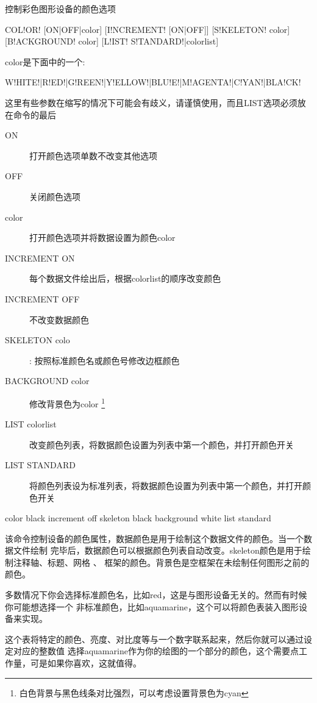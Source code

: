 \label{cmd:color}

控制彩色图形设备的颜色选项

\begin{SACSTX}
COL!OR! [ON|OFF|color] [I!NCREMENT! [ON|OFF]] [S!KELETON! color] 
    [B!ACKGROUND! color] [L!IST! S!TANDARD!|colorlist]
\end{SACSTX}
color是下面中的一个:
\begin{SACSTX}
W!HITE!|R!ED!|G!REEN!|Y!ELLOW!|BLU!E!|M!AGENTA!|C!YAN!|BLA!CK!
\end{SACSTX}
		
这里有些参数在缩写的情况下可能会有歧义，请谨慎使用，而且LIST选项必须放在命令的最后

\begin{description}
\item [ON] 打开颜色选项单数不改变其他选项
\item [OFF] 关闭颜色选项
\item [color] 打开颜色选项并将数据设置为颜色color
\item [INCREMENT ON] 每个数据文件绘出后，根据colorlist的顺序改变颜色
\item [INCREMENT OFF] 不改变数据颜色 
\item [SKELETON colo]: 按照标准颜色名或颜色号修改边框颜色
\item [BACKGROUND color] 修改背景色为color
        \footnote{白色背景与黑色线条对比强烈，可以考虑设置背景色为cyan}
\item [LIST colorlist] 改变颜色列表，将数据颜色设置为列表中第一个颜色，并打开颜色开关
\item [LIST STANDARD] 将颜色列表设为标准列表，将数据颜色设置为列表中第一个颜色，并打开颜色开关
\end{description}

\begin{SACDFT}
color black increment off skeleton black background white 
    list standard
\end{SACDFT}

该命令控制设备的颜色属性，数据颜色是用于绘制这个数据文件的颜色。当一个数据文件绘制
完毕后，数据颜色可以根据颜色列表自动改变。skeleton颜色是用于绘制注释轴、标题、网格 、
框架的颜色。背景色是空框架在未绘制任何图形之前的颜色。

多数情况下你会选择标准颜色名，比如red，这是与图形设备无关的。然而有时候你可能想选择一个
非标准颜色，比如aquamarine，这个可以将颜色表装入图形设备来实现。

这个表将特定的颜色、亮度、对比度等与一个数字联系起来，然后你就可以通过设定对应的整数值
选择aquamarine作为你的绘图的一个部分的颜色，这个需要点工作量，可是如果你喜欢，这就值得。

